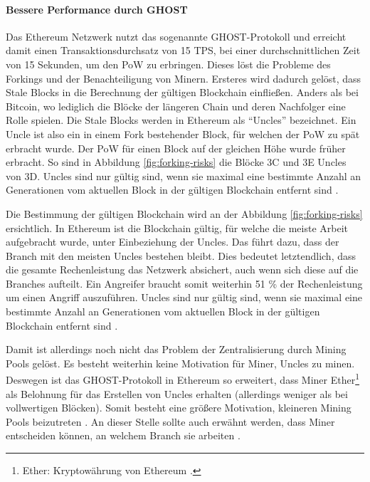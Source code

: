 \paragraph{Bessere Performance durch GHOST}
Das Ethereum Netzwerk nutzt das sogenannte \acs{GHOST}-Protokoll und erreicht damit einen Transaktionsdurchsatz von 15 \acs{TPS}, bei einer durchschnittlichen Zeit von 15 Sekunden, um den \acs{PoW} zu erbringen. Dieses löst die Probleme des Forkings und der Benachteiligung von Minern. Ersteres wird dadurch gelöst, dass Stale Blocks in die Berechnung der gültigen Blockchain einfließen. Anders als bei Bitcoin, wo lediglich die Blöcke der längeren Chain und deren Nachfolger eine Rolle spielen. Die Stale Blocks werden in Ethereum als ``Uncles'' bezeichnet. Ein Uncle ist also ein in einem Fork bestehender Block, für welchen der \acs{PoW} zu spät erbracht wurde. Der \acs{PoW} für einen Block auf der gleichen Höhe wurde früher erbracht. So sind in Abbildung \ref{fig:forking-risks} die Blöcke 3C und 3E Uncles von 3D. Uncles sind nur gültig sind, wenn sie maximal eine bestimmte Anzahl an Generationen vom aktuellen Block in der gültigen Blockchain entfernt sind \cite{EthereumTeamEthereumWhitePaper2017}.

Die Bestimmung der gültigen Blockchain wird an der Abbildung \ref{fig:forking-risks} ersichtlich. In Ethereum ist die Blockchain gültig, für welche die meiste Arbeit aufgebracht wurde, unter Einbeziehung der Uncles. Das führt dazu, dass der Branch mit den meisten Uncles bestehen bleibt. Dies bedeutet letztendlich, dass die gesamte Rechenleistung das Netzwerk absichert, auch wenn sich diese auf die Branches aufteilt. Ein Angreifer braucht somit weiterhin 51 \% der Rechenleistung um einen Angriff auszuführen. Uncles sind nur gültig sind, wenn sie maximal eine bestimmte Anzahl an Generationen vom aktuellen Block in der gültigen Blockchain entfernt sind \cite{EthereumTeamEthereumWhitePaper2017} \cite{SompolinskyAcceleratingBitcoinTransaction2013}.

Damit ist allerdings noch nicht das Problem der Zentralisierung durch Mining Pools gelöst. Es besteht weiterhin keine Motivation für Miner, Uncles zu minen. Deswegen ist das \acs{GHOST}-Protokoll in Ethereum so erweitert, dass Miner Ether\footnote{Ether: Kryptowährung von Ethereum \cite{EthereumTeamEthereumWhitePaper2017}.} als Belohnung für das Erstellen von Uncles erhalten (allerdings weniger als bei vollwertigen Blöcken). Somit besteht eine größere Motivation, kleineren Mining Pools beizutreten \cite{EthereumTeamEthereumWhitePaper2017}. An dieser Stelle sollte auch erwähnt werden, dass Miner entscheiden können, an welchem Branch sie arbeiten \cite{ZhengBlockchainChallengesOpportunities2017}. 

